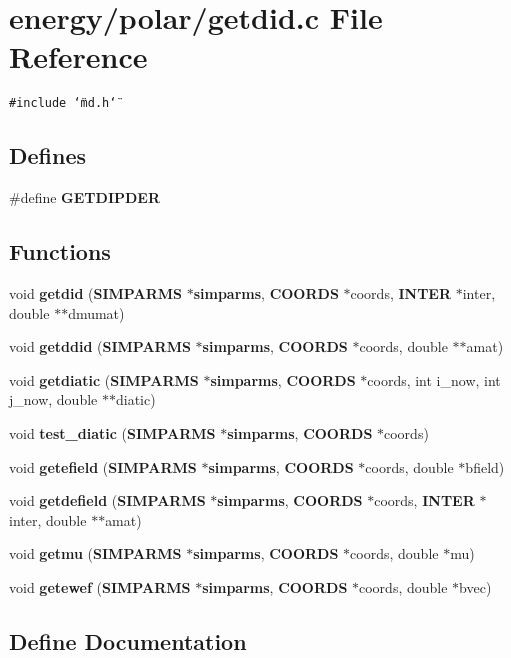 \section{energy/polar/getdid.c File Reference}
\label{energy_2polar_2getdid_8c}
{\tt \#include \char`\"{}md.h\char`\"{}}\par
\subsection*{Defines}
\begin{CompactItemize}
\item 
\#define {\bf GETDIPDER}
\end{CompactItemize}
\subsection*{Functions}
\begin{CompactItemize}
\item 
void {\bf getdid} ({\bf SIMPARMS} $\ast${\bf simparms}, {\bf COORDS} $\ast$coords, {\bf INTER} $\ast$inter, double $\ast$$\ast$dmumat)
\item 
void {\bf getddid} ({\bf SIMPARMS} $\ast${\bf simparms}, {\bf COORDS} $\ast$coords, double $\ast$$\ast$amat)
\item 
void {\bf getdiatic} ({\bf SIMPARMS} $\ast${\bf simparms}, {\bf COORDS} $\ast$coords, int i\_\-now, int j\_\-now, double $\ast$$\ast$diatic)
\item 
void {\bf test\_\-diatic} ({\bf SIMPARMS} $\ast${\bf simparms}, {\bf COORDS} $\ast$coords)
\item 
void {\bf getefield} ({\bf SIMPARMS} $\ast${\bf simparms}, {\bf COORDS} $\ast$coords, double $\ast$bfield)
\item 
void {\bf getdefield} ({\bf SIMPARMS} $\ast${\bf simparms}, {\bf COORDS} $\ast$coords, {\bf INTER} $\ast$inter, double $\ast$$\ast$amat)
\item 
void {\bf getmu} ({\bf SIMPARMS} $\ast${\bf simparms}, {\bf COORDS} $\ast$coords, double $\ast$mu)
\item 
void {\bf getewef} ({\bf SIMPARMS} $\ast${\bf simparms}, {\bf COORDS} $\ast$coords, double $\ast$bvec)
\end{CompactItemize}


\subsection{Define Documentation}
